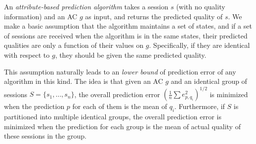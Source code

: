 




An {\it attribute-based prediction algorithm} takes a session $s$ (with no quality information) and an AC $g$ as input, and returns the predicted quality of $s$. We make a basic assumption that the algorithm maintains a set of states, and if a set of sessions are received when the algorithm is in the same states, their predicted qualities are only a function of their values on $g$. Specifically, if they are identical with respect to $g$, they should be given the same predicted quality. 

\label{subsec:lowerbound}
This assumption naturally leads to an {\it lower bound} of prediction error of any algorithm in this kind. 
The idea is that given an AC $g$ and an identical group of sessions $S=\{s_1,\dots,s_n\}$, the overall prediction error $\left(\frac{1}{n}\sum e_{p,q_i}^2\right)^{1/2}$ is minimized when the prediction $p$ for each of them is the mean of $q_i$. Furthermore, if $S$ is partitioned into multiple identical groups,  the overall prediction error is minimized when the prediction for each group is the mean of actual quality of these sessions in the group. 


